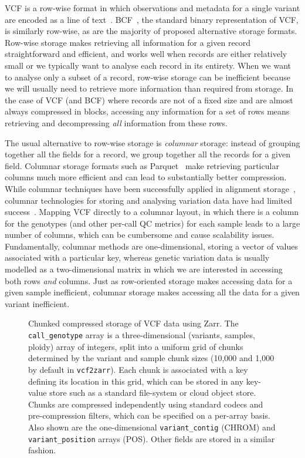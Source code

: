 \documentclass[a4paper,num-refs]{oup-contemporary}
\begin{document}
VCF is a row-wise format in which
observations and metadata for a single variant are
encoded as a line of text~\citep{danecek2011variant}.
BCF~\citep{li2011statistical}, the standard binary representation of VCF,
is similarly row-wise, as
are the majority of proposed alternative storage
formats.
Row-wise storage makes retrieving all information
for a given record straightforward and efficient,
and works well when records are either relatively small
or we typically want to analyse each record in its entirety.
When we want to analyse only a subset of a record,
row-wise storage can be inefficient because we will usually need to
retrieve more information than required from storage. In the case
of VCF (and BCF) where records are not of a fixed size and
are almost always compressed in blocks, accessing any information
for a set of rows means retrieving and decompressing \emph{all}
information from these rows.

The usual alternative to row-wise storage is \emph{columnar} storage:
instead of grouping together all the fields for a record,
we group together all the records for a given field.
Columnar storage formats such as Parquet~\citep{parquet2024}
make retrieving particular columns much
more efficient and can lead to substantially better compression.
While columnar techniques have been successfully applied
in alignment
storage~\citep[e.g.][]{bonfield2014scramble,nothaft2015rethinking,bonfield2022cram},
columnar technologies for
storing and analysing variation data have had limited
success~\citep{boufea2017managing,fan2020variant}.
Mapping VCF directly to a columnar layout, in which there is a
column for the genotypes (and other per-call QC metrics)
for each sample leads to a large number of columns, which
can be cumbersome and cause scalability issues.
Fundamentally, columnar methods are one-dimensional, storing a vector
of values associated with a particular key, whereas
genetic variation data is usually modelled as a two-dimensional matrix
in which we are interested in accessing both rows \emph{and} columns.
Just as row-oriented storage makes accessing data for a given
sample inefficient, columnar storage makes accessing all the data
for a given variant inefficient.

\begin{figure}
\resizebox{225pt}{!}{}
\caption{Chunked compressed storage of VCF data using Zarr.
The \texttt{call\_genotype} array is a three-dimensional (variants, samples,
ploidy) array of integers, split into a uniform grid of
chunks determined by the variant and sample chunk sizes (10,000
and 1,000 by default in \texttt{vcf2zarr}). Each chunk is associated
with a key defining its location in this grid, which can be stored
in any key-value store such as a standard file-system or cloud object
store. Chunks are compressed independently using standard
codecs and pre-compression filters, which can be specified on a per-array
basis. Also shown are the one-dimensional \texttt{variant\_contig} (CHROM)
and \texttt{variant\_position} arrays (POS). Other fields are stored
in a similar fashion. \label{fig-data-model}}
\end{figure}
\end{document}
